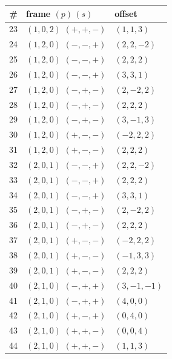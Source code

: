 \begin{tabular}{rll}
\toprule
\# & frame $(p)\,(s)$ & offset \\
\midrule
23 & $(1,0,2)$ $(+,+,-)$ & $(1,1,3)$ \\
24 & $(1,2,0)$ $(-,-,+)$ & $(2,2,-2)$ \\
25 & $(1,2,0)$ $(-,-,+)$ & $(2,2,2)$ \\
26 & $(1,2,0)$ $(-,-,+)$ & $(3,3,1)$ \\
27 & $(1,2,0)$ $(-,+,-)$ & $(2,-2,2)$ \\
28 & $(1,2,0)$ $(-,+,-)$ & $(2,2,2)$ \\
29 & $(1,2,0)$ $(-,+,-)$ & $(3,-1,3)$ \\
30 & $(1,2,0)$ $(+,-,-)$ & $(-2,2,2)$ \\
31 & $(1,2,0)$ $(+,-,-)$ & $(2,2,2)$ \\
32 & $(2,0,1)$ $(-,-,+)$ & $(2,2,-2)$ \\
33 & $(2,0,1)$ $(-,-,+)$ & $(2,2,2)$ \\
34 & $(2,0,1)$ $(-,-,+)$ & $(3,3,1)$ \\
35 & $(2,0,1)$ $(-,+,-)$ & $(2,-2,2)$ \\
36 & $(2,0,1)$ $(-,+,-)$ & $(2,2,2)$ \\
37 & $(2,0,1)$ $(+,-,-)$ & $(-2,2,2)$ \\
38 & $(2,0,1)$ $(+,-,-)$ & $(-1,3,3)$ \\
39 & $(2,0,1)$ $(+,-,-)$ & $(2,2,2)$ \\
40 & $(2,1,0)$ $(-,+,+)$ & $(3,-1,-1)$ \\
41 & $(2,1,0)$ $(-,+,+)$ & $(4,0,0)$ \\
42 & $(2,1,0)$ $(+,-,+)$ & $(0,4,0)$ \\
43 & $(2,1,0)$ $(+,+,-)$ & $(0,0,4)$ \\
44 & $(2,1,0)$ $(+,+,-)$ & $(1,1,3)$ \\
\bottomrule
\end{tabular}\hfill
